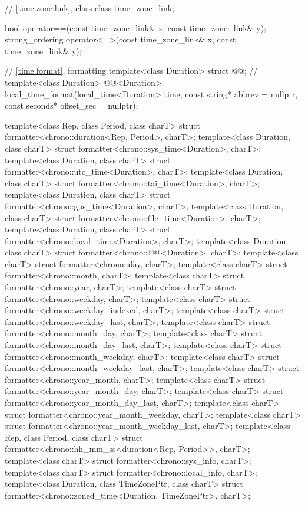 \begin{codeblock}
{{    // \ref{time.zone.link}, class 
    class time_zone_link;

    bool operator==(const time_zone_link& x, const time_zone_link& y);
    strong_ordering operator<=>(const time_zone_link& x, const time_zone_link& y);

    // \ref{time.format}, formatting
    template<class Duration> struct @@;        // \expos
    template<class Duration>
      @@<Duration>
        local_time_format(local_time<Duration> time, const string* abbrev = nullptr,
                          const seconds* offset_sec = nullptr);
  }

  template<class Rep, class Period, class charT>
    struct formatter<chrono::duration<Rep, Period>, charT>;
  template<class Duration, class charT>
    struct formatter<chrono::sys_time<Duration>, charT>;
  template<class Duration, class charT>
    struct formatter<chrono::utc_time<Duration>, charT>;
  template<class Duration, class charT>
    struct formatter<chrono::tai_time<Duration>, charT>;
  template<class Duration, class charT>
    struct formatter<chrono::gps_time<Duration>, charT>;
  template<class Duration, class charT>
    struct formatter<chrono::file_time<Duration>, charT>;
  template<class Duration, class charT>
    struct formatter<chrono::local_time<Duration>, charT>;
  template<class Duration, class charT>
    struct formatter<chrono::@@<Duration>, charT>;
  template<class charT> struct formatter<chrono::day, charT>;
  template<class charT> struct formatter<chrono::month, charT>;
  template<class charT> struct formatter<chrono::year, charT>;
  template<class charT> struct formatter<chrono::weekday, charT>;
  template<class charT> struct formatter<chrono::weekday_indexed, charT>;
  template<class charT> struct formatter<chrono::weekday_last, charT>;
  template<class charT> struct formatter<chrono::month_day, charT>;
  template<class charT> struct formatter<chrono::month_day_last, charT>;
  template<class charT> struct formatter<chrono::month_weekday, charT>;
  template<class charT> struct formatter<chrono::month_weekday_last, charT>;
  template<class charT> struct formatter<chrono::year_month, charT>;
  template<class charT> struct formatter<chrono::year_month_day, charT>;
  template<class charT> struct formatter<chrono::year_month_day_last, charT>;
  template<class charT> struct formatter<chrono::year_month_weekday, charT>;
  template<class charT> struct formatter<chrono::year_month_weekday_last, charT>;
  template<class Rep, class Period, class charT>
    struct formatter<chrono::hh_mm_ss<duration<Rep, Period>>, charT>;
  template<class charT> struct formatter<chrono::sys_info, charT>;
  template<class charT> struct formatter<chrono::local_info, charT>;
  template<class Duration, class TimeZonePtr, class charT>
    struct formatter<chrono::zoned_time<Duration, TimeZonePtr>, charT>;

}
\end{codeblock}
